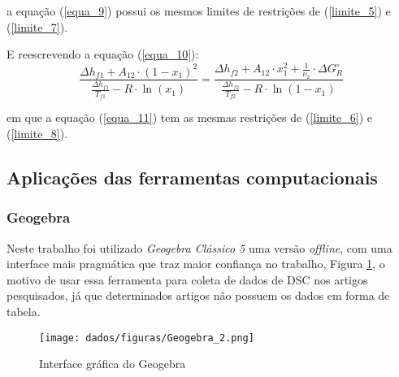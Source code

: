a equação (\ref{equa_9}) possui os mesmos limites de restrições de (\ref{limite_5}) e (\ref{limite_7}).

E reescrevendo a equação (\ref{equa_10}):
\begin{equation}
\frac{\Delta h_{f1}+A_{12}\cdot (1-x_{1})^{2}}{\frac{\Delta h_{f1}}{T_{f1}} -R\cdot\ln(x_{1})}=\frac{\Delta h_{f2}+A_{12}\cdot x_{1}^{2} +\frac{1}{\nu_{2}}\cdot\Delta G_{R}^{\circ}}{\frac{\Delta h_{f2}}{T_{f2}} -R\cdot\ln (1-x_{1})}
\label{equa_11}
\end{equation}

em que a equação (\ref{equa_11}) tem as mesmas restrições de (\ref{limite_6}) e (\ref{limite_8}).

\subsection{Aplicações das ferramentas computacionais}
\subsubsection{Geogebra}

Neste trabalho foi utilizado \textit{Geogebra Clássico 5}  uma versão \textit{offline}, com uma interface mais pragmática que traz maior confiança no trabalho, Figura \ref{fig:12}, o motivo de usar essa ferramenta para coleta de dados de DSC nos artigos pesquisados, já que determinados artigos não possuem os dados em forma de tabela.
\begin{figure}[H]
	\centering
	\texttt{[image: dados/figuras/Geogebra\_2.png]}
	\caption[Interface gráfica do Geogebra]{Interface gráfica do Geogebra}
	\label{fig:12}
\end{figure}

